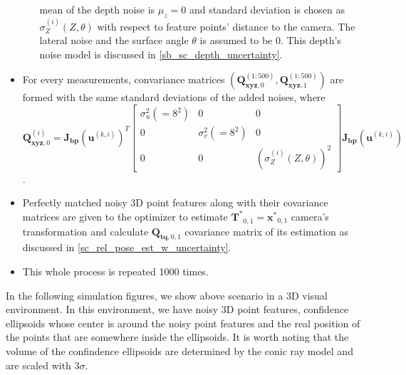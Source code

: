 \documentclass[a4paper]{report}
\numberwithin{figure}{section}
\begin{document}
\begin{itemize}
\begin{itemize}
            mean of the depth noise is $\mu_z=0$ and standard deviation is chosen 
            as $\sigma_Z^{(i)} (Z,\theta)$ 
            with respect to feature points' distance to the camera.
            The lateral noise and the surface angle $\theta$ is assumed to be 0.
            This depth's noise model is discussed in \ref{sb_sc_depth_uncertainty}.
        \end{itemize}
    \item For every measurements, convariance matrices 
      $(\mathbf{Q}_{\mathbf{xyz},0}^{(1:500)}, \mathbf{Q}_{\mathbf{xyz},1}^{(1:500)})$ are formed with 
      the same standard deviations of the added noises, where  
    $\mathbf{Q}_{\mathbf{xyz},0}^{(i)} = \mathbf{J_{bp}}(\mathbf{u}^{(k,i)})^T
  \begin{bmatrix} 
    \sigma_u^2(=8^2) & 0 & 0 \\ 
    0 & \sigma_v^2(=8^2) & 0 \\
    0 & 0 & (\sigma_Z^{(i)}(Z, \theta))^2
  \end{bmatrix} \mathbf{J_{bp}}(\mathbf{u}^{(k,i)})$.

    \item Perfectly matched noisy 3D point features along with their covariance matrices 
      are given to the optimizer 
      to estimate $\mathbf{T^*}_{0,1}=\mathbf{x^*}_{0,1}$ camera's transformation 
      and calculate $\mathbf{Q}_{\mathbf{tq},0,1}$ covariance matrix of its estimation 
      as discussed in \ref{sc_rel_pose_est_w_uncertainty}.
    \item This whole process is repeated 1000 times.
\end{itemize}

In the following simulation figures, we show 
above scenario in a 3D visual environment. 
In this environment, we have  
noisy 3D point features, confidence ellipsoids whose center is around the 
noisy point features and the real position of the points that are somewhere 
inside the ellipsoids.
It is worth noting that the volume of the confindence ellipsoids are 
determined by the conic ray model and are scaled with $3\sigma$.
\end{document}
